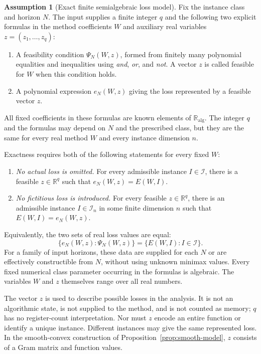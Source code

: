 \documentclass[11pt]{article}
\numberwithin{equation}{section}
\theoremstyle{definition}
\newtheorem{assumption}[theorem]{Assumption}
\newcommand{\R}{\mathbb R}
\newcommand{\K}{\mathbb R_{\mathrm{alg}}}
\begin{document}
\begin{assumption}[Exact finite semialgebraic loss model]\label{ass:finite}
Fix the instance class and horizon $N$. The input supplies a finite integer $q$ and the following two explicit formulas in the method coefficients $W$ and auxiliary real variables $z=(z_1,\ldots,z_q)$:
\begin{enumerate}[label=(\roman*),leftmargin=2.3em,itemsep=2pt]
\item A feasibility condition $\Psi_N(W,z)$, formed from finitely many polynomial equalities and inequalities using \emph{and}, \emph{or}, and \emph{not}. A vector $z$ is called feasible for $W$ when this condition holds.
\item A polynomial expression $e_N(W,z)$ giving the loss represented by a feasible vector $z$.
\end{enumerate}
All fixed coefficients in these formulas are known elements of $\K$. The integer $q$ and the formulas may depend on $N$ and the prescribed class, but they are the same for every real method $W$ and every instance dimension $n$.

Exactness requires both of the following statements for every fixed $W$:
\begin{enumerate}[label=(\alph*),leftmargin=2.3em,itemsep=2pt]
\item \emph{No actual loss is omitted.} For every admissible instance $I\in\mathscr I$, there is a feasible $z\in\R^q$ such that $e_N(W,z)=E(W,I)$.
\item \emph{No fictitious loss is introduced.} For every feasible $z\in\R^q$, there is an admissible instance $I\in\mathscr I_n$ in some finite dimension $n$ such that $E(W,I)=e_N(W,z)$.
\end{enumerate}
Equivalently, the two sets of real loss values are equal:
\begin{equation}
 \{e_N(W,z):\Psi_N(W,z)\}
 =
 \{E(W,I):I\in\mathscr I\}.
 \label{eq:loss-model}
\end{equation}
For a family of input horizons, these data are supplied for each $N$ or are effectively constructible from $N$, without using unknown minimax values. Every fixed numerical class parameter occurring in the formulas is algebraic. The variables $W$ and $z$ themselves range over all real numbers.
\end{assumption}

The vector $z$ is used to describe possible losses in the analysis. It is not an algorithmic state, is not supplied to the method, and is not counted as memory; $q$ has no register-count interpretation. Nor must $z$ encode an entire function or identify a unique instance. Different instances may give the same represented loss. In the smooth-convex construction of Proposition~\ref{prop:smooth-model}, $z$ consists of a Gram matrix and function values.
\end{document}
